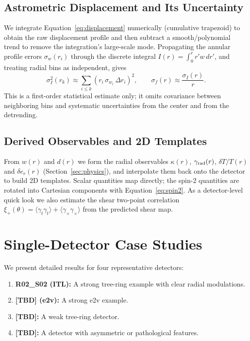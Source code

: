 \subsection{Astrometric Displacement and Its Uncertainty} \label{sec:astro_method}

We integrate Equation~\ref{eq:displacement} numerically (cumulative trapezoid) to obtain the
raw displacement profile and then subtract a smooth/polynomial trend to remove the
integration's large-scale mode. Propagating the annular profile errors $\sigma_{w}(r_i)$
through the discrete integral $I(r)=\int_0^r r' w\,dr'$, and treating radial bins as
independent, gives
%
\begin{equation}
\sigma_I^2(r_k) \approx \sum_{i \le k}\left(r_i\,\sigma_{w_i}\,\Delta r_i\right)^2,
\qquad
\sigma_f(r) \approx \frac{\sigma_I(r)}{r}.
\label{eq:astro_err}
\end{equation}
%
This is a first-order statistical estimate only; it omits covariance between neighboring
bins and systematic uncertainties from the center and from the detrending.

\subsection{Derived Observables and 2D Templates} \label{sec:templates}

From $w(r)$ and $d(r)$ we form the radial observables $\kappa(r)$, $\gamma_{\rm rad}(r)$,
$\delta T/T(r)$ and $\delta e_r(r)$ (Section~\ref{sec:physics}), and interpolate them back
onto the detector to build 2D templates. Scalar quantities map directly; the spin-2
quantities are rotated into Cartesian components with Equation~\ref{eq:spin2}. As a
detector-level quick look we also estimate the shear two-point correlation
$\xi_+(\theta)=\langle\gamma_t\gamma_t\rangle+\langle\gamma_\times\gamma_\times\rangle$ from
the predicted shear map.

\section{Single-Detector Case Studies} \label{sec:case_studies}

We present detailed results for four representative detectors:

\begin{enumerate}
\item \textbf{R02\_S02 (ITL):} A strong tree-ring example with clear radial modulations.
\item \textbf{[TBD] (e2v):} A strong e2v example.
\item \textbf{[TBD]:} A weak tree-ring detector.
\item \textbf{[TBD]:} A detector with asymmetric or pathological features.
\end{enumerate}

